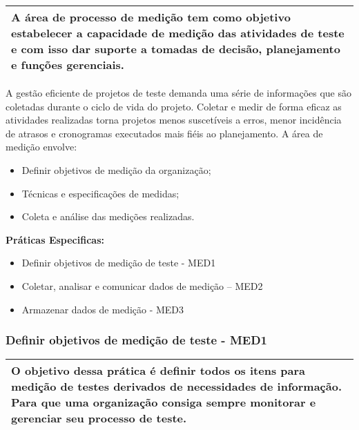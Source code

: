 \begin{table}[!ht]
\centering
\begin{tabular}{|p{130mm}|}
\hline
A área de processo de medição tem como objetivo estabelecer a capacidade de medição das atividades de teste e com isso dar suporte a tomadas de decisão, planejamento e funções gerenciais. \\ 
\hline
\end{tabular}
\end{table}

A gestão eficiente de projetos de teste demanda uma série de informações que são coletadas durante o ciclo de vida do projeto. Coletar e medir de forma eficaz as atividades realizadas torna projetos menos suscetíveis a erros, menor incidência de atrasos e cronogramas executados mais fiéis ao planejamento. A área de medição envolve:

\begin{itemize}
    \item Definir objetivos de medição da organização;
    \item Técnicas e especificações de medidas;
    \item Coleta e análise das medições realizadas.
\end{itemize}

\textbf{Práticas Especificas: }
\begin{itemize}
    \item Definir objetivos de medição de teste - MED1
    \item Coletar, analisar e comunicar dados de medição – MED2
    \item Armazenar dados de medição - MED3
\end{itemize}

\subsubsection{Definir objetivos de medição de teste - MED1}
\label{sec:med1}

\begin{table}[!ht]
\centering
\begin{tabular}{|p{130mm}|}
\hline
O objetivo dessa prática é definir todos os itens para medição de testes derivados de necessidades de informação. Para que uma organização consiga sempre monitorar e gerenciar seu processo de teste. \\ 
\hline
\end{tabular}
\end{table}

